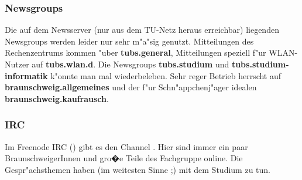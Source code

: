 \subsubsection*{Newsgroups}

Die auf dem Newsserver  (nur aus dem TU-Netz heraus
erreichbar) liegenden Newsgroups werden leider nur sehr m"a"sig genutzt.
Mitteilungen des Rechenzentrums kommen "uber \textbf{tubs.general},
Mitteilungen speziell f"ur WLAN-Nutzer auf \textbf{tubs.wlan.d}. Die Newsgroups
\textbf{tubs.studium} und \textbf{tubs.studium-informatik} k"onnte man mal
wiederbeleben. Sehr reger Betrieb herrscht auf
\textbf{braunschweig.allgemeines} und der f"ur Schn"appchenj"ager idealen
\textbf{braunschweig.kaufrausch}.

\subsubsection*{IRC}

Im Freenode IRC () gibt es den Channel . Hier
sind immer ein paar BraunschweigerInnen und gro�e Teile des Fachgruppe online. Die Gespr"achsthemen haben (im weitesten
Sinne ;) mit dem Studium zu tun.

